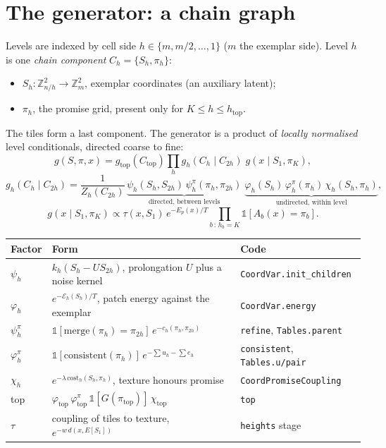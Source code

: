 \documentclass[11pt]{article}
\newcommand{\Z}{\mathbb{Z}}
\newcommand{\1}{\mathds{1}}
\begin{document}
\section{The generator: a chain graph}

Levels are indexed by cell side $h \in \{m, m/2, \dots, 1\}$ ($m$ the exemplar side).
Level $h$ is one \emph{chain component} $C_h = \{S_h, \pi_h\}$:
\begin{itemize}
  \item $S_h : \Z_{n/h}^2 \to \Z_m^2$, exemplar coordinates (an auxiliary latent);
  \item $\pi_h$, the promise grid, present only for $K \le h \le h_{\text{top}}$.
\end{itemize}
The tiles form a last component. The generator is a product of \emph{locally normalised}
level conditionals, directed coarse to fine:
\begin{equation}
  g(S,\pi,x) = g_{\text{top}}(C_{\text{top}}) \prod_{h} g_h(C_h \mid C_{2h}) \; g(x \mid S_1, \pi_K),
\end{equation}
\begin{equation}
  g_h(C_h \mid C_{2h}) = \frac{1}{Z_h(C_{2h})}\,
  \underbrace{\psi_h(S_h,S_{2h})\,\psi^\pi_h(\pi_h,\pi_{2h})}_{\text{directed, between levels}}\;
  \underbrace{\varphi_h(S_h)\,\varphi^\pi_h(\pi_h)\,\chi_h(S_h,\pi_h)}_{\text{undirected, within level}} ,
\end{equation}
\begin{equation}
  g(x \mid S_1, \pi_K) \propto \tau(x, S_1)\, e^{-E_p(x)/T} \prod_{b\,:\,h_b=K} \1[A_b(x) = \pi_b].
\end{equation}

\begin{center}
\begin{tabular}{@{}lll@{}}
\toprule
Factor & Form & Code \\
\midrule
$\psi_h$ & $k_h(S_h - U S_{2h})$, prolongation $U$ plus a noise kernel & \texttt{CoordVar.init\_children} \\
$\varphi_h$ & $e^{-\mathcal{E}_h(S_h)/T}$, patch energy against the exemplar & \texttt{CoordVar.energy} \\
$\psi^\pi_h$ & $\1[\mathrm{merge}(\pi_h)=\pi_{2h}]\,e^{-c_h(\pi_h,\pi_{2h})}$ & \texttt{refine}, \texttt{Tables.parent} \\
$\varphi^\pi_h$ & $\1[\mathrm{consistent}(\pi_h)]\,e^{-\sum u_h - \sum e_h}$ & \texttt{consistent}, \texttt{Tables.u/pair} \\
$\chi_h$ & $e^{-\lambda\,\mathrm{cost}_h(S_h,\pi_h)}$, texture honours promise & \texttt{CoordPromiseCoupling} \\
top & $\varphi_{\text{top}}\,\varphi^\pi_{\text{top}}\,\1[G(\pi_{\text{top}})]\,\chi_{\text{top}}$ & \texttt{top} \\
$\tau$ & coupling of tiles to texture, $e^{-w\,d(x, E[S_1])}$ & \texttt{heights} stage \\
\bottomrule
\end{tabular}
\end{center}
\end{document}
